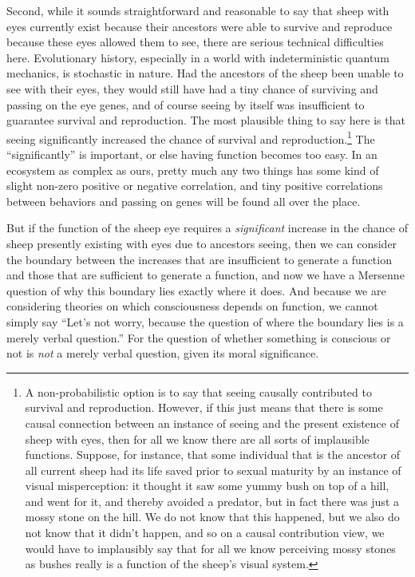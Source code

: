 Second, while it sounds straightforward and reasonable to say that sheep with eyes currently exist because their 
ancestors were able to survive and reproduce because these eyes allowed them to see, there are 
serious technical difficulties here. Evolutionary history, especially in a world with indeterministic quantum
mechanics, is stochastic in nature. Had the ancestors of the sheep been unable to see with their eyes, they would 
still have had a tiny chance of surviving and passing on the eye genes, and of course seeing by itself was insufficient 
to guarantee survival and reproduction. The most plausible thing to say here is that seeing significantly increased the chance of 
survival and reproduction.\footnote{A non-probabilistic option is to say that seeing causally contributed to survival and 
reproduction. However, if this just means that there is some causal connection between an instance of seeing and the 
present existence of sheep with eyes, then for all we know there are all sorts of implausible functions. Suppose, for
instance, that some individual that is the ancestor of all current sheep had its life saved prior to sexual maturity  
by an instance of visual misperception: it thought it saw some yummy bush on top of a hill, and went for it, 
and thereby avoided a predator, but in fact there was just a mossy stone on the hill. We do not know that this happened,
but we also do not know that it didn't happen, and so on a causal contribution view, we would have to implausibly say that for all
we know perceiving mossy stones as bushes really is a function of the sheep's visual system.} The ``significantly'' is important, or else having function becomes too easy. In an ecosystem as complex 
as ours, pretty much any two things has some kind of slight non-zero positive or negative correlation, and tiny positive 
correlations between behaviors and passing on genes will be found all over the place. 

But if the function of the sheep eye requires a \textit{significant} increase in the chance of sheep presently existing 
with eyes due to ancestors seeing, then we can consider the boundary between the increases that are insufficient to generate a function and those that 
are sufficient to generate a function, and now we have a Mersenne question of why this boundary lies exactly where it does. And because
we are considering theories on which consciousness depends on function, we cannot simply say ``Let's not worry, because the 
question of where the boundary lies is a merely verbal question.'' For the question of whether something is conscious or not 
is \textit{not} a merely verbal question, given its moral significance.

